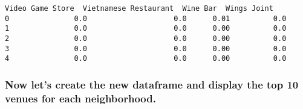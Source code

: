 \documentclass[11pt]{article}
\begin{document}
\begin{tcolorbox}[breakable, size=fbox, boxrule=.5pt, pad at break*=1mm, opacityfill=0]
\begin{Verbatim}[commandchars=\\\{\}]
   Video Game Store  Vietnamese Restaurant  Wine Bar  Wings Joint
0               0.0                    0.0      0.01          0.0
1               0.0                    0.0      0.00          0.0
2               0.0                    0.0      0.00          0.0
3               0.0                    0.0      0.00          0.0
4               0.0                    0.0      0.00          0.0
\end{Verbatim}
\end{tcolorbox}
        
    \hypertarget{now-lets-create-the-new-dataframe-and-display-the-top-10-venues-for-each-neighborhood.}{%
\subsubsection{Now let's create the new dataframe and display the top 10
venues for each
neighborhood.}\label{now-lets-create-the-new-dataframe-and-display-the-top-10-venues-for-each-neighborhood.}}
\end{document}

